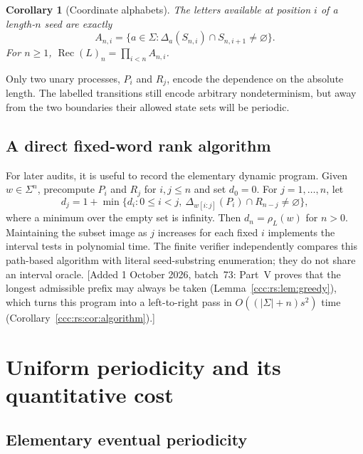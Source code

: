 \documentclass[11pt,letterpaper]{article}
\newtheorem{corollary}[theorem]{Corollary}
\theoremstyle{definition}
\theoremstyle{remark}
\newcommand{\rec}{\operatorname{Rec}}
\newcommand{\rank}{\rho}
\newcommand{\waddsevthree}[1]{\textup{[}Added 1 October 2026, batch~73: #1\textup{]}}
\begin{document}
\begin{corollary}[Coordinate alphabets]\label{ccc:ps:cor:coordinate-alphabet}
The letters available at position $i$ of a length-$n$ seed are exactly
\begin{equation}\label{ccc:ps:eq:coordinate-letters}
 A_{n,i}=\{a\in\Sigma:
           \Delta_a(S_{n,i})\cap S_{n,i+1}\ne\varnothing\}.
\end{equation}
For $n\ge1$, $\rec(L)_n=\prod_{i<n}A_{n,i}$.
\end{corollary}

Only two unary processes, $P_i$ and $R_j$, encode the dependence on the
absolute length. The labelled transitions still encode arbitrary
nondeterminism, but away from the two boundaries their allowed state sets
will be periodic.

\subsection{A direct fixed-word rank algorithm}

For later audits, it is useful to record the elementary dynamic program.
Given $w\in\Sigma^n$, precompute $P_i$ and $R_j$ for $i,j\le n$ and set
$d_0=0$. For $j=1,\ldots,n$, let
\begin{equation}\label{ccc:ps:eq:rank-dp}
 d_j=1+\min\{d_i:0\le i<j,\
                    \Delta_{w[i:j]}(P_i)\cap R_{n-j}\ne\varnothing\},
\end{equation}
where a minimum over the empty set is infinity. Then
$d_n=\rank_L(w)$ for $n>0$. Maintaining the subset image as $j$ increases
for each fixed $i$ implements the interval tests in polynomial time.
The finite verifier independently compares this path-based algorithm with
literal seed-substring enumeration; they do not share an interval oracle.
\waddsevthree{Part~V proves that the longest admissible prefix may always be
taken (Lemma~\ref{ccc:rs:lem:greedy}), which turns this program into a
left-to-right pass in $O((|\Sigma|+n)s^2)$ time
(Corollary~\ref{ccc:rs:cor:algorithm}).}

\section{Uniform periodicity and its quantitative cost}\label{ccc:ps:sec:periodicity}

\subsection{Elementary eventual periodicity}
\end{document}
